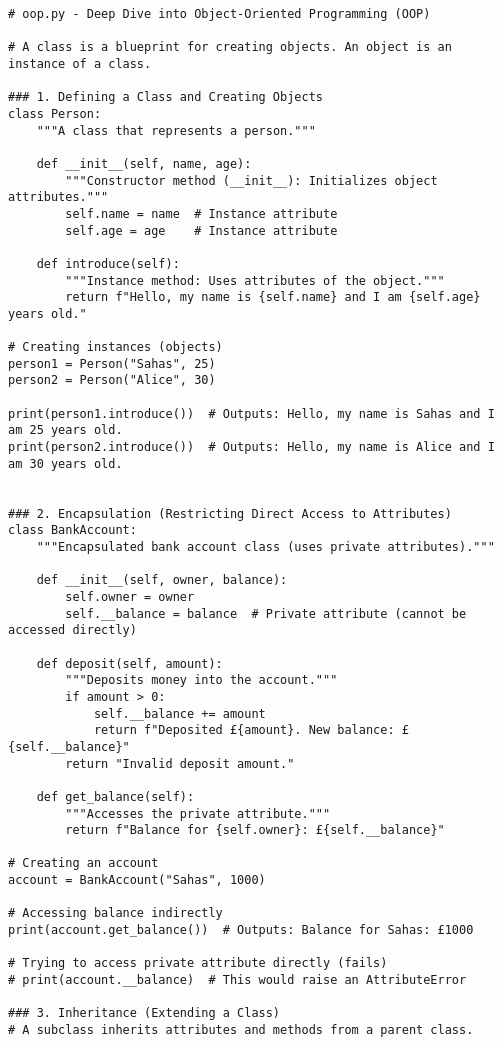 \begin{verbatim}
# oop.py - Deep Dive into Object-Oriented Programming (OOP)

# A class is a blueprint for creating objects. An object is an instance of a class.

### 1. Defining a Class and Creating Objects
class Person:
    """A class that represents a person."""

    def __init__(self, name, age):
        """Constructor method (__init__): Initializes object attributes."""
        self.name = name  # Instance attribute
        self.age = age    # Instance attribute

    def introduce(self):
        """Instance method: Uses attributes of the object."""
        return f"Hello, my name is {self.name} and I am {self.age} years old."

# Creating instances (objects)
person1 = Person("Sahas", 25)
person2 = Person("Alice", 30)

print(person1.introduce())  # Outputs: Hello, my name is Sahas and I am 25 years old.
print(person2.introduce())  # Outputs: Hello, my name is Alice and I am 30 years old.


### 2. Encapsulation (Restricting Direct Access to Attributes)
class BankAccount:
    """Encapsulated bank account class (uses private attributes)."""

    def __init__(self, owner, balance):
        self.owner = owner
        self.__balance = balance  # Private attribute (cannot be accessed directly)

    def deposit(self, amount):
        """Deposits money into the account."""
        if amount > 0:
            self.__balance += amount
            return f"Deposited £{amount}. New balance: £{self.__balance}"
        return "Invalid deposit amount."

    def get_balance(self):
        """Accesses the private attribute."""
        return f"Balance for {self.owner}: £{self.__balance}"

# Creating an account
account = BankAccount("Sahas", 1000)

# Accessing balance indirectly
print(account.get_balance())  # Outputs: Balance for Sahas: £1000

# Trying to access private attribute directly (fails)
# print(account.__balance)  # This would raise an AttributeError

### 3. Inheritance (Extending a Class)
# A subclass inherits attributes and methods from a parent class.


\end{verbatim}
